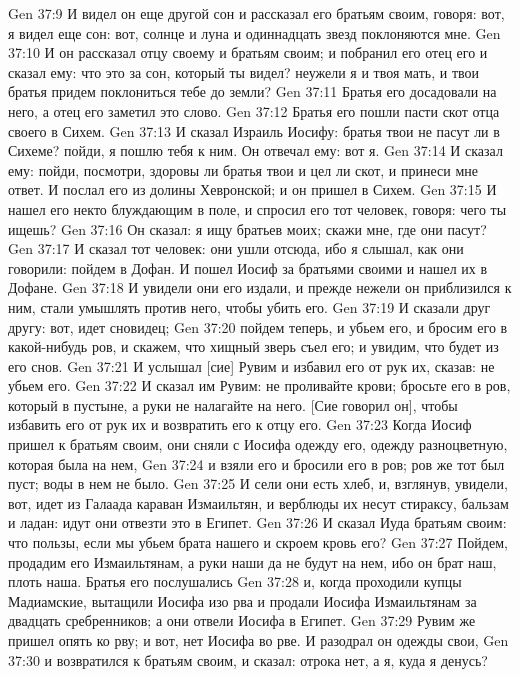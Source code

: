 Gen 37:9  И видел он еще другой сон и рассказал его братьям своим, говоря: вот, я видел еще сон: вот, солнце и луна и одиннадцать звезд поклоняются мне.
Gen 37:10  И он рассказал отцу своему и братьям своим; и побранил его отец его и сказал ему: что это за сон, который ты видел? неужели я и твоя мать, и твои братья придем поклониться тебе до земли?
Gen 37:11  Братья его досадовали на него, а отец его заметил это слово.
Gen 37:12  Братья его пошли пасти скот отца своего в Сихем.
Gen 37:13  И сказал Израиль Иосифу: братья твои не пасут ли в Сихеме? пойди, я пошлю тебя к ним. Он отвечал ему: вот я.
Gen 37:14  И сказал ему: пойди, посмотри, здоровы ли братья твои и цел ли скот, и принеси мне ответ. И послал его из долины Хевронской; и он пришел в Сихем.
Gen 37:15  И нашел его некто блуждающим в поле, и спросил его тот человек, говоря: чего ты ищешь?
Gen 37:16  Он сказал: я ищу братьев моих; скажи мне, где они пасут?
Gen 37:17  И сказал тот человек: они ушли отсюда, ибо я слышал, как они говорили: пойдем в Дофан. И пошел Иосиф за братьями своими и нашел их в Дофане.
Gen 37:18  И увидели они его издали, и прежде нежели он приблизился к ним, стали умышлять против него, чтобы убить его.
Gen 37:19  И сказали друг другу: вот, идет сновидец;
Gen 37:20  пойдем теперь, и убьем его, и бросим его в какой-нибудь ров, и скажем, что хищный зверь съел его; и увидим, что будет из его снов.
Gen 37:21  И услышал [сие] Рувим и избавил его от рук их, сказав: не убьем его.
Gen 37:22  И сказал им Рувим: не проливайте крови; бросьте его в ров, который в пустыне, а руки не налагайте на него. [Сие говорил он], чтобы избавить его от рук их и возвратить его к отцу его.
Gen 37:23  Когда Иосиф пришел к братьям своим, они сняли с Иосифа одежду его, одежду разноцветную, которая была на нем,
Gen 37:24  и взяли его и бросили его в ров; ров же тот был пуст; воды в нем не было.
Gen 37:25  И сели они есть хлеб, и, взглянув, увидели, вот, идет из Галаада караван Измаильтян, и верблюды их несут стираксу, бальзам и ладан: идут они отвезти это в Египет.
Gen 37:26  И сказал Иуда братьям своим: что пользы, если мы убьем брата нашего и скроем кровь его?
Gen 37:27  Пойдем, продадим его Измаильтянам, а руки наши да не будут на нем, ибо он брат наш, плоть наша. Братья его послушались
Gen 37:28  и, когда проходили купцы Мадиамские, вытащили Иосифа изо рва и продали Иосифа Измаильтянам за двадцать сребренников; а они отвели Иосифа в Египет.
Gen 37:29  Рувим же пришел опять ко рву; и вот, нет Иосифа во рве. И разодрал он одежды свои,
Gen 37:30  и возвратился к братьям своим, и сказал: отрока нет, а я, куда я денусь?
